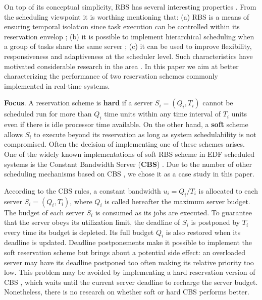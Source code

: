 \documentclass[times, 10pt,twocolumn]{article}
\begin{document}
On top of its conceptual simplicity, RBS has several interesting
properties \cite{steffens.ea03:resource}. From the scheduling
viewpoint it is worthing mentioning that: (a) RBS is a means of
ensuring temporal isolation since task execution can be controlled
within its reservation envelop
\cite{abeni.ea04:resource,mercer.ea94:processor,sprunt.ea89:aperiodic,spuri.ea96:scheduling};
(b) it is possible to implement hierarchical scheduling when a group
of tasks share the same server
\cite{davis.ea05:hierarchical,davis.ea08:investigation}; (c) it can be
used to improve flexibility, responsiveness and adaptiveness at the
scheduler level.  Such characteristics have motivated considerable
research in the area
\cite{abeni.ea99:adaptive,caccamo.ea00:capacity,caccamo.ea05:efficient,oliveira.ea08:dynamic,oliveira.ea09:dynamic,lin.ea05:improving}.
In this paper we aim at better characterizing the performance of two
reservation schemes commonly implemented in real-time systems.

\textbf{Focus}.  A reservation scheme is \textbf{hard} if a server
$S_i = (Q_i,T_i)$ cannot be scheduled run for more than $Q_i$ time
units within any time interval of $T_i$ units even if there is idle
processor time available. On the other hand, a \textbf{soft} scheme
allows $S_i$ to execute beyond its reservation as long as system
schedulability is not compromised. Often the decision of implementing
one of these schemes arises. One of the widely known implementations
of soft RBS scheme in EDF scheduled systems is the Constant Bandwidth
Server (\textbf{CBS}) \cite{abeni.ea04:resource}.  Due to the number
of other scheduling mechanisms based on CBS
\cite{abeni.ea05:qos,caccamo.ea00:capacity,caccamo.ea05:efficient,lipari.ea00:greedy},
we chose it as a case study in this paper.

According to the CBS rules, a constant bandwidth $u_i = Q_i/T_i$ is
allocated to each server $S_i = (Q_i,T_i)$, where $Q_i$ is called
hereafter the maximum server budget. The budget of each server $S_i$
is consumed as its jobs are executed. To guarantee that the server
obeys its utilization limit, the deadline of $S_i$ is postponed by
$T_i$ every time its budget is depleted.  Its full budget $Q_i$ is
also restored when its deadline is updated.  Deadline postponements
make it possible to implement the soft reservation scheme but brings
about a potential side effect: an overloaded server may have its
deadline postponed too often making its relative priority too low.
This problem may be avoided by implementing a hard reservation version
of CBS \cite{buttazzo05:soft}, which waits until the current server
deadline to recharge the server budget.  Nonetheless, there is no
research on whether soft or hard CBS performs better.
\end{document}

